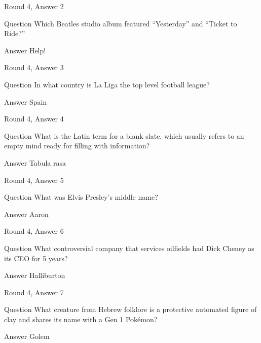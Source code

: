 \documentclass[11pt]{beamer}
\begin{document}
\begin{frame}{Round 4, Answer 2}
\begin{block}{Question}
Which Beatles studio album featured ``Yesterday'' and ``Ticket to Ride?''
\end{block}
\pause{}
\begin{block}{Answer}
Help!
\end{block}
\end{frame}
    

\begin{frame}{Round 4, Answer 3}
\begin{block}{Question}
In what country is La Liga the top level football league\@?
\end{block}
\pause{}
\begin{block}{Answer}
Spain
\end{block}
\end{frame}
    

\begin{frame}{Round 4, Answer 4}
\begin{block}{Question}
What is the Latin term for a blank slate, which usually refers to an empty mind ready for filling with information\@?
\end{block}
\pause{}
\begin{block}{Answer}
Tabula rasa
\end{block}
\end{frame}
    

\begin{frame}{Round 4, Answer 5}
\begin{block}{Question}
What was Elvis Presley's middle name\@?
\end{block}
\pause{}
\begin{block}{Answer}
Aaron
\end{block}
\end{frame}
    

\begin{frame}{Round 4, Answer 6}
\begin{block}{Question}
What controversial company that services oilfields had Dick Cheney as its CEO for 5 years\@?
\end{block}
\pause{}
\begin{block}{Answer}
Halliburton
\end{block}
\end{frame}
    

\begin{frame}{Round 4, Answer 7}
\begin{block}{Question}
What creature from Hebrew folklore is a protective automated figure of clay and shares its name with a Gen 1 Pokémon\@?
\end{block}
\pause{}
\begin{block}{Answer}
Golem
\end{block}
\end{frame}
    
\end{document}
